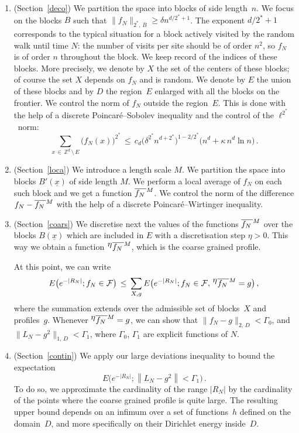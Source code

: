 \documentclass[10pt]{amsart}
\theoremstyle{definition}\newtheorem{defi}[theo]{Definition}\newtheorem{rema}[theo]{Remark}\newtheorem{exam}[theo]{Example}\newtheorem{exem}[theo]{Example}\newtheorem{nota}[theo]{Notation}
\newcommand{\xx}{{\underline{x}}}
\newcommand*\fmn{\overline{f_N\,}^{\lower2pt\hbox{$\scriptstyle M$}}}
\newcommand*\fmne{^{\displaystyle \eta}\overline{f_N\,}^{\lower2pt\hbox{$\scriptstyle M$}}}
\newcommand*\Zd {{\mathbb Z^d}}
\newcommand{\cF}{\mathcal{F}}
\begin{document}
\begin{enumerate}
\item \label{list.2.3.4}(Section~\ref{deco}) We partition the space into blocks of side length~$n$. We focus on the blocks $B$ such that $\|f_N\|_{2^*,\,B}\geq \delta n^{d/2^*+1}$. The exponent $d/2^*+1$ corresponds to the typical situation for a block actively visited by the random walk until time $N$: the number of visits per site should be of order $n^2$, so $f_N$ is of order $n$ throughout the block. We keep record of the indices of these blocks. More precisely, we denote by $X$ the set of the centers of these blocks; of course the set $X$ depends on $f_N$ and is random. We denote by $E$ the union of these blocks and by $D$ the region~$E$ enlarged with all the blocks on the frontier. We control the norm of $f_N$ outside the region~$E$. This is done with the help of a discrete Poincaré--Sobolev inequality and the control of the $\ell^{2^*}$~norm:
\begin{equation*}
\sum_{x\,\in\,
\Zd\,\setminus\,E}
\big(f_N(x)\big)^{2^*}\,\leq\, c_d\big(
\delta^{2^*} n^{d+2^*}
\big)^{1-2/2^*}
\big(n^d+ {\kappa \,n^d\ln n}
\big)\,.
\end{equation*}

\item \label{list.2.3.5}(Section~\ref{loca}) We introduce a length scale $M$. We partition the space into blocks $B'(\xx)$ of side length $M$. We perform a local average of $f_N$ on each such block and we get a function $\fmn$. We control the norm of the difference $f_N-\fmn$ with the help of a discrete Poincaré--Wirtinger inequality.


\item \label{list.2.3.6}(Section~\ref{coars}) We discretise next the values of the functions $\fmn$ over the blocks $B(\xx)$ which are included in $E$ with a discretisation step $\eta>0$. This way we obtain a function $\fmne$, which is the coarse grained profile.

At this point, we can write
\[
E\big(e^{-|R_N|};f_N\in\cF
\big)
\,\leq\,
\sum_{X,g} E\big(e^{-|R_N|}; f_N\in\cF,\,
\fmne=g
\big)\,,
\nonumber
\]
where the summation extends over the admissible set of blocks~$X$ and profiles~$g$. Whenever $\fmne=g$, we can show that $\|f_N-g\|_{2,\,D}<\Gamma_0$, and $\|L_N-g^2\|_{1,\,D}<\Gamma_1$, where $\Gamma_0$, $\Gamma_1$ are explicit functions of $N$.


\item \label{list.2.3.7}(Section~\ref{contin}) We apply our large deviations inequality to bound the expectation
\[
E\big(e^{-|R_N|};
\left\|L_N-g^2\right\|<\Gamma_1
\big)\,.
\]
To do so, we approximate the cardinality of the range $|R_N|$ by the cardinality of the points where the coarse grained profile is quite large. The resulting upper bound depends on an infimum over a set of functions~$h$ defined on the domain~$D$, and more specifically on their Dirichlet energy inside~$D$.


\end{enumerate}
\end{document}
